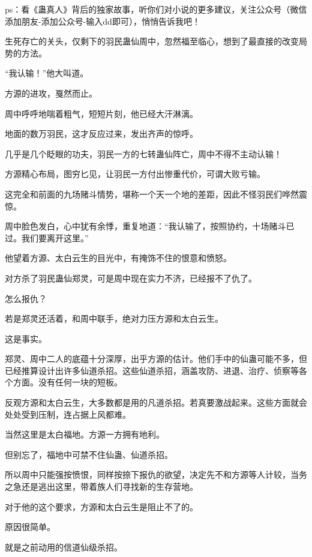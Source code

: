 
\begin{this_body}

ps：看《蛊真人》背后的独家故事，听你们对小说的更多建议，关注公众号（微信添加朋友-添加公众号-输入dd即可），悄悄告诉我吧！

生死存亡的关头，仅剩下的羽民蛊仙周中，忽然福至临心，想到了最直接的改变局势的方法。

“我认输！”他大叫道。

方源的进攻，戛然而止。

周中呼呼地喘着粗气，短短片刻，他已经大汗淋漓。

地面的数万羽民，这才反应过来，发出齐声的惊呼。

几乎是几个眨眼的功夫，羽民一方的七转蛊仙阵亡，周中不得不主动认输！

方源精心布局，图穷匕见，让羽民一方付出惨重代价，可谓大败亏输。

这完全和前面的九场赌斗情势，堪称一个天一个地的差距，因此不怪羽民们哗然震惊。

周中脸色发白，心中犹有余悸，重复地道：“我认输了，按照协约，十场赌斗已过。我们要离开这里。”

他望着方源、太白云生的目光中，有掩饰不住的恨意和愤怒。

对方杀了羽民蛊仙郑灵，可是周中现在实力不济，已经报不了仇了。

怎么报仇？

若是郑灵还活着，和周中联手，绝对力压方源和太白云生。

这是事实。

郑灵、周中二人的底蕴十分深厚，出乎方源的估计。他们手中的仙蛊可能不多，但已经推算设计出许多仙道杀招。这些仙道杀招，涵盖攻防、进退、治疗、侦察等各个方面。没有任何一块的短板。

反观方源和太白云生，大多数都是用的凡道杀招。若真要激战起来。这些方面就会处处受到压制，连占据上风都难。

当然这里是太白福地。方源一方拥有地利。

但别忘了，福地中可禁不住仙蛊、仙道杀招。

所以周中只能强按愤恨，同样按捺下报仇的欲望，决定先不和方源等人计较，当务之急还是逃出这里，带着族人们寻找新的生存营地。

对于他的这个要求，方源和太白云生是阻止不了的。

原因很简单。

就是之前动用的信道仙级杀招。


\end{this_body}
